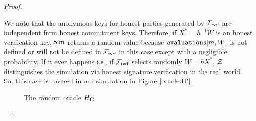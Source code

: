 \begin{proof}
\begin{itemize}
		We note that the anonymous keys for honest parties generated by $ \mathcal{F}_{\textsf{rvrf}} $ are independent from honest commitment keys. Therefore, if $ X^* = h^{-1}W $ is an honest verification key, $ \mathsf{Sim} $ returns a random value because  $ \texttt{evaluations}[m,W] $ is not defined or will not be defined in $ \mathcal{F}_{\textsf{rvrf}} $ in this case except with a negligible probability. If it ever happens i.e., if $ \mathcal{F}_{\textsf{rvrf}} $ selects randomly $ W = hX^* $, $ \mathcal{Z} $ distinguishes the simulation via honest signature verification in the real world. So, this case is covered in our simulation in Figure \ref{oracle:H'}.
		
		\begin{figure}
			\begin{minipage}{4cm}
			\centering
			\noindent{}	
			\caption{The random oracle $ H_{\mathbf{G}} $}
			\label{oracle:HgnoPK}
		
	\end{minipage}
\hfill
	\begin{minipage}{7cm}
			\centering
			
			\noindent{}
\end{minipage}
\end{figure}
\end{itemize}
\end{proof}

